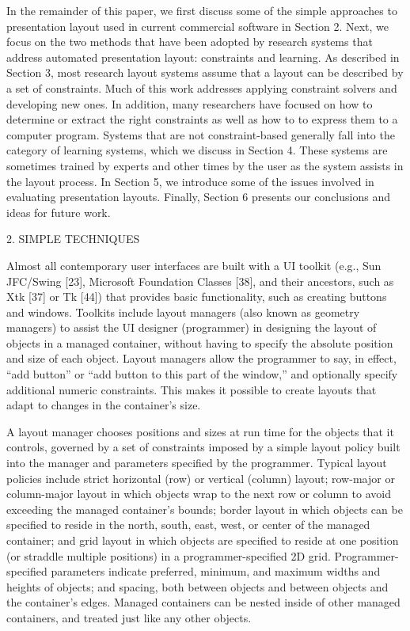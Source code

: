 
    In the remainder of this paper, we first discuss some of the simple approaches to presentation layout used in current commercial software in Section 2. Next, we focus on the two methods that have been adopted by research systems that address automated presentation layout: constraints and learning. As described in Section 3, most research layout systems assume that a layout can be described by a set of constraints. Much of this work addresses applying constraint solvers and developing new ones. In addition, many researchers have focused on how to determine or extract the right constraints as well as how to to express them to a computer program. Systems that are not constraint-based generally fall into the category of learning systems, which we discuss in Section 4. These systems are sometimes trained by experts and other times by the user as the system assists in the layout process. In Section 5, we introduce some of the issues involved in evaluating presentation layouts. Finally, Section 6 presents our conclusions and ideas for future work.

    2. SIMPLE TECHNIQUES

    Almost all contemporary user interfaces are built with a UI toolkit (e.g., Sun JFC/Swing [23], Microsoft Foundation Classes [38], and their ancestors, such as Xtk [37] or Tk [44]) that provides basic functionality, such as creating buttons and windows. Toolkits include layout managers (also known as geometry managers) to assist the UI designer (programmer) in designing the layout of objects in a managed container, without having to specify the absolute position and size of each object. Layout managers allow the programmer to say, in effect, “add button” or “add button to this part of the window,” and optionally specify additional numeric constraints. This makes it possible to create layouts that adapt to changes in the container’s size.

    A layout manager chooses positions and sizes at run time for the objects that it controls, governed by a set of constraints imposed by a simple layout policy built into the manager and parameters specified by the programmer. Typical layout policies include strict horizontal (row) or vertical (column) layout; row-major or column-major layout in which objects wrap to the next row or column to avoid exceeding the managed container’s bounds; border layout in which objects can be specified to reside in the north, south, east, west, or center of the managed container; and grid layout in which objects are specified to reside at one position (or straddle multiple positions) in a programmer-specified 2D grid. Programmer-specified parameters indicate preferred, minimum, and maximum widths and heights of objects; and spacing, both between objects and between objects and the container’s edges. Managed containers can be nested inside of other managed containers, and treated just like any other objects.

